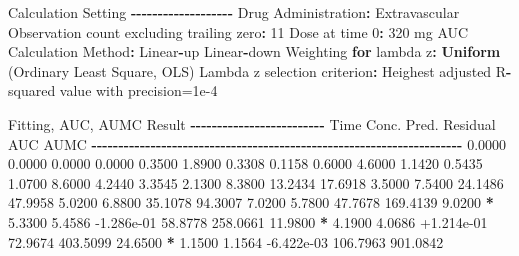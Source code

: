 \documentclass[
  12pt,
]{krantz}
\newenvironment{Shaded}{\begin{snugshade}}{\end{snugshade}}
\newcommand{\ControlFlowTok}[1]{\textcolor[rgb]{0.13,0.29,0.53}{\textbf{#1}}}
\newcommand{\DecValTok}[1]{\textcolor[rgb]{0.00,0.00,0.81}{#1}}
\newcommand{\FloatTok}[1]{\textcolor[rgb]{0.00,0.00,0.81}{#1}}
\newcommand{\KeywordTok}[1]{\textcolor[rgb]{0.13,0.29,0.53}{\textbf{#1}}}
\newcommand{\NormalTok}[1]{#1}
\newcommand{\OperatorTok}[1]{\textcolor[rgb]{0.81,0.36,0.00}{\textbf{#1}}}
\newcommand{\StringTok}[1]{\textcolor[rgb]{0.31,0.60,0.02}{#1}}
\begin{document}
\begin{Shaded}
\begin{Highlighting}[]
\NormalTok{Calculation Setting}
\OperatorTok{{-}{-}{-}{-}{-}{-}{-}{-}{-}{-}{-}{-}{-}{-}{-}{-}{-}{-}{-}}
\NormalTok{Drug Administration}\OperatorTok{:}\StringTok{ }\NormalTok{Extravascular}
\NormalTok{Observation count excluding trailing zero}\OperatorTok{:}\StringTok{ }\DecValTok{11}
\NormalTok{Dose at time }\DecValTok{0}\OperatorTok{:}\StringTok{ }\DecValTok{320}\NormalTok{ mg}
\NormalTok{AUC Calculation Method}\OperatorTok{:}\StringTok{ }\NormalTok{Linear}\OperatorTok{{-}}\NormalTok{up Linear}\OperatorTok{{-}}\NormalTok{down}
\NormalTok{Weighting }\ControlFlowTok{for}\NormalTok{ lambda z}\OperatorTok{:}\StringTok{ }\KeywordTok{Uniform}\NormalTok{ (Ordinary Least Square, OLS)}
\NormalTok{Lambda z selection criterion}\OperatorTok{:}\StringTok{ }\NormalTok{Heighest adjusted R}\OperatorTok{{-}}\NormalTok{squared value with precision=}\FloatTok{1e{-}4}


\NormalTok{Fitting, AUC, AUMC Result}
\OperatorTok{{-}{-}{-}{-}{-}{-}{-}{-}{-}{-}{-}{-}{-}{-}{-}{-}{-}{-}{-}{-}{-}{-}{-}{-}{-}}
\StringTok{      }\NormalTok{Time         Conc.      Pred.   Residual       AUC       AUMC}
\OperatorTok{{-}{-}{-}{-}{-}{-}{-}{-}{-}{-}{-}{-}{-}{-}{-}{-}{-}{-}{-}{-}{-}{-}{-}{-}{-}{-}{-}{-}{-}{-}{-}{-}{-}{-}{-}{-}{-}{-}{-}{-}{-}{-}{-}{-}{-}{-}{-}{-}{-}{-}{-}{-}{-}{-}{-}{-}{-}{-}{-}{-}{-}{-}{-}{-}{-}{-}{-}{-}{-}}
\StringTok{     }\FloatTok{0.0000}       \FloatTok{0.0000}                           \FloatTok{0.0000}     \FloatTok{0.0000}
     \FloatTok{0.3500}       \FloatTok{1.8900}                           \FloatTok{0.3308}     \FloatTok{0.1158}
     \FloatTok{0.6000}       \FloatTok{4.6000}                           \FloatTok{1.1420}     \FloatTok{0.5435}
     \FloatTok{1.0700}       \FloatTok{8.6000}                           \FloatTok{4.2440}     \FloatTok{3.3545}
     \FloatTok{2.1300}       \FloatTok{8.3800}                          \FloatTok{13.2434}    \FloatTok{17.6918}
     \FloatTok{3.5000}       \FloatTok{7.5400}                          \FloatTok{24.1486}    \FloatTok{47.9958}
     \FloatTok{5.0200}       \FloatTok{6.8800}                          \FloatTok{35.1078}    \FloatTok{94.3007}
     \FloatTok{7.0200}       \FloatTok{5.7800}                          \FloatTok{47.7678}   \FloatTok{169.4139}
     \FloatTok{9.0200} \OperatorTok{*}\StringTok{     }\FloatTok{5.3300}     \FloatTok{5.4586} \FloatTok{{-}1.286e{-}01}    \FloatTok{58.8778}   \FloatTok{258.0661}
    \FloatTok{11.9800} \OperatorTok{*}\StringTok{     }\FloatTok{4.1900}     \FloatTok{4.0686} \FloatTok{+1.214e{-}01}    \FloatTok{72.9674}   \FloatTok{403.5099}
    \FloatTok{24.6500} \OperatorTok{*}\StringTok{     }\FloatTok{1.1500}     \FloatTok{1.1564} \FloatTok{{-}6.422e{-}03}   \FloatTok{106.7963}   \FloatTok{901.0842}


\end{Highlighting}
\end{Shaded}
\end{document}
